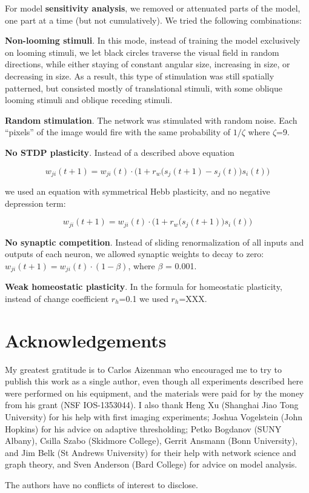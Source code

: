 \documentclass{article}
\begin{document}
For model \textbf{sensitivity analysis}, we removed or attenuated parts of the model, one part at a time (but not cumulatively). We tried the following combinations:

\textbf{Non-looming stimuli}. In this mode, instead of training the model exclusively on looming stimuli, we let black circles traverse the visual field in random directions, while either staying of constant angular size, increasing in size, or decreasing in size. As a result, this type of stimulation was still spatially patterned, but consisted mostly of translational stimuli, with some oblique looming stimuli and oblique receding stimuli.

\textbf{Random stimulation}. The network was stimulated with random noise. Each “pixels” of the image would fire with the same probability of $1/\zeta$ where $\zeta$=9.

\textbf{No STDP plasticity}. Instead of a described above equation 

\[ w_{ji}(t+1) = w_{ji}(t)\cdot\Big(1+r_w\big(s_j(t+1)-s_j(t)\big)s_i(t)\Big) \]

we used an equation with symmetrical Hebb plasticity, and no negative depression term: 

\[ w_{ji}(t+1) = w_{ji}(t)\cdot\Big(1+r_w\big(s_j(t+1)\big)s_i(t)\Big) \]

\textbf{No synaptic competition}. Instead of sliding renormalization of all inputs and outputs of each neuron, we allowed synaptic weights to decay to zero: $w_{ji}(t+1) = w_{ji}(t)\cdot (1-\beta)$, where $\beta$ = 0.001.

\textbf{Weak homeostatic plasticity}. In the formula for homeostatic plasticity, instead of change coefficient $r_h$=0.1 we used $r_h$=XXX.

\section*{Acknowledgements}

My greatest gratitude is to Carlos Aizenman who encouraged me to try to publish this work as a single author, even though all experiments described here were performed on his equipment, and the materials were paid for by the money from his grant (NSF IOS-1353044). I also thank Heng Xu (Shanghai Jiao Tong University) for his help with first imaging experiments; Joshua Vogelstein (John Hopkins) for his advice on adaptive thresholding; Petko Bogdanov (SUNY Albany), Csilla Szabo (Skidmore College), Gerrit Ansmann (Bonn University), and Jim Belk (St Andrews University) for their help with network science and graph theory, and Sven Anderson (Bard College) for advice on model analysis.


The authors have no conflicts of interest to disclose.

\nolinenumbers


\end{document}
